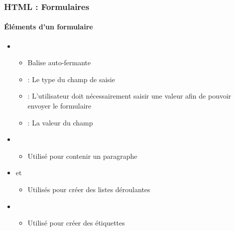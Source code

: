 \documentclass[xcolor=table]{beamer}
\begin{document}
\begin{frame}[fragile]
\frametitle{HTML : Formulaires}
\framesubtitle{Éléments d'un formulaire}

\begin{itemize}
	\item {}
	\begin{itemize}
		\item Balise auto-fermante 
		\item {} : Le type du champ de saisie
		\item {} : L'utilisateur doit nécessairement saisir une valeur afin de pouvoir envoyer le formulaire
		\item {} : La valeur du champ
	\end{itemize}
	\item {}
	\begin{itemize}
		\item Utilisé pour contenir un paragraphe
	\end{itemize}
	\item {} et 
	\begin{itemize}
		\item Utilisés pour créer des listes déroulantes
	\end{itemize}
	\item {}
	\begin{itemize}
		\item Utilisé pour créer des étiquettes
	\end{itemize}
\end{itemize}

\end{frame}
\end{document}
